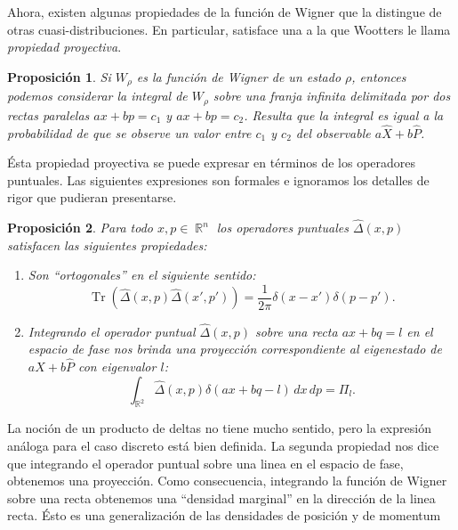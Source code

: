 \documentclass[a4paper,11pt]{report}
\DeclareMathOperator{\R}{\mathbb{R}}
\DeclareMathOperator{\Tr}{Tr}
\newtheorem{proposition}{Proposición}
\begin{document}
  Ahora, existen algunas propiedades de la función de Wigner
  que la distingue de otras cuasi-distribuciones. En
  particular, satisface una a la que Wootters
  \cite{wootters1987} le llama \textit{propiedad
  proyectiva}.
  \begin{proposition}
    \label{prop:proy_prop}
    Si $W_\rho$ es la función de Wigner de un estado $\rho$,
    entonces podemos considerar la integral de $W_\rho$
    sobre una franja infinita delimitada por dos rectas
    paralelas $ax+bp=c_1$ y $ax+bp=c_2$.  Resulta que la
    integral es igual a la probabilidad de que se observe un
    valor entre $c_1$ y $c_2$ del observable $a \hat X + b
    \hat P$. 
  \end{proposition}
  Ésta propiedad proyectiva se puede expresar en términos de
  los operadores puntuales. Las siguientes expresiones son
  formales e ignoramos los detalles de rigor que pudieran
  presentarse.
  \begin{proposition}
    Para todo $x,p \in \R^{n}$ los operadores puntuales
    $\hat\Delta(x,p)$ satisfacen las siguientes propiedades:
    \begin{enumerate}
      \item Son ``ortogonales'' en el siguiente sentido:
        \begin{equation}
          \Tr\left( \hat\Delta(x,p)\hat\Delta(x',p') \right) 
          = \frac{1}{2\pi} \delta(x-x')\delta(p-p').
        \end{equation}
      \item Integrando el operador puntual $\hat\Delta(x,p)$
        sobre una recta $ax+bq = l$ en el espacio de fase
        nos brinda una proyección correspondiente al
        eigenestado de $a\hat X + b \hat P$ con eigenvalor
        $l$:
        \begin{equation}
          \int_{\R^2} \hat\Delta(x,p) \delta(ax+bq-l) \, dx
          \, dp = \Pi_l.
        \end{equation}
    \end{enumerate}
  \end{proposition}
  La noción de un producto de deltas no tiene mucho sentido,
  pero la expresión análoga para el caso discreto está bien
  definida. La segunda propiedad nos dice que integrando el
  operador puntual sobre una linea en el espacio de fase,
  obtenemos una proyección. Como consecuencia, integrando la
  función de Wigner sobre una recta obtenemos una ``densidad
  marginal'' en la dirección de la linea recta. Ésto es una
  generalización de las densidades de posición y de momentum
\end{document}
